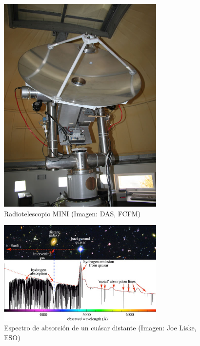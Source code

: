 \begin{figure}[p]
	\centering
	\includegraphics[width=3.25in]{rsc/mini.jpg}
	\caption{Radiotelescopio MINI (Imagen: DAS, FCFM)}
	\label{fig:mini}
\end{figure}

\begin{figure}[p]
	\centering
	\includegraphics[width=3.25in]{rsc/spectrum.jpg}
	\caption{Espectro de absorción de un cuásar distante (Imagen: Joe Liske, ESO)}
	\label{fig:spectrum}
\end{figure}